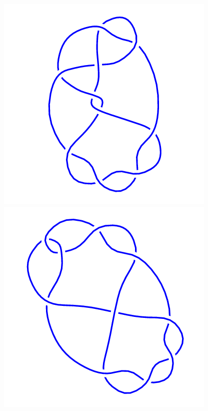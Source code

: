 \begin{figure}[H]
\begin{minipage}[b]{.18\linewidth}
    \end{minipage}
    \begin{minipage}[b]{.18\linewidth}
        \centering
        \includegraphics[width=\linewidth]{../data/10_14.png}
    \end{minipage}
    \begin{minipage}[b]{.18\linewidth}
        \centering
        \includegraphics[width=\linewidth]{../data/10_15.png}

\end{minipage}
\end{figure}
